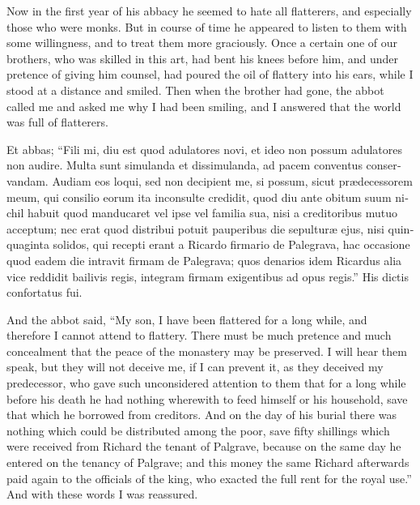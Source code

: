 \documentclass{book}
\begin{document}
\begin{paracol}{2}
\begin{otherlanguage}{latin}
\end{otherlanguage}

\switchcolumn

Now in the first year of his abbacy he seemed to hate all flatterers, and especially those who were monks. But in course of time he appeared to listen to them with some willingness, and to treat them more graciously. Once a certain one of our brothers, who was skilled in this art, had bent his knees before him, and under pretence of giving him counsel, had poured the oil of flattery into his ears, while I stood at a distance and smiled. Then when the brother had gone, the abbot called me and asked me why I had been smiling, and I answered that the world was full of flatterers.

\switchcolumn*

\begin{otherlanguage}{latin}
Et abbas; ``Fili mi, diu est quod adulatores novi, et ideo non possum adulatores non audire. Multa sunt simulanda et dissimulanda, ad pacem conventus conservandam. Audiam eos loqui, sed non decipient me, si possum, sicut pr\ae{}decessorem meum, qui consilio eorum ita inconsulte credidit, quod diu ante obitum suum nichil habuit quod manducaret vel ipse vel familia sua, nisi a creditoribus mutuo acceptum; nec erat quod distribui potuit pauperibus die sepultur\ae{} ejus, nisi quinquaginta solidos, qui recepti erant a Ricardo firmario de Palegrava, hac occasione quod eadem die intravit firmam de Palegrava; quos denarios idem Ricardus alia vice reddidit bailivis regis, integram firmam exigentibus ad opus regis.'' His dictis confortatus fui.
\end{otherlanguage}

\switchcolumn

And the abbot said, ``My son, I have been flattered for a long while, and therefore I cannot attend to flattery. There must be much pretence and much concealment that the peace of the monastery may be preserved. I will hear them speak, but they will not deceive me, if I can prevent it, as they deceived my predecessor, who gave such unconsidered attention to them that for a long while before his death he had nothing wherewith to feed himself or his household, save that which he borrowed from creditors. And on the day of his burial there was nothing which could be distributed among the poor, save fifty shillings which were received from Richard the tenant of Palgrave, because on the same day he entered on the tenancy of Palgrave; and this money the same Richard afterwards paid again to the officials of the king, who exacted the full rent for the royal use.'' And with these words I was reassured.


\end{paracol}
\end{document}
